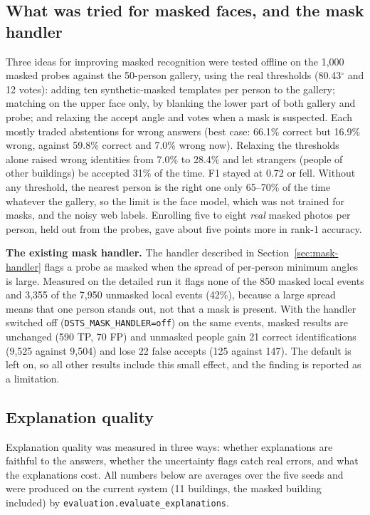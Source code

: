 \documentclass[12pt,a4paper,oneside]{report}
\begin{document}
\subsection{What was tried for masked faces, and the mask handler}\label{sec:res-mask}
Three ideas for improving masked recognition were tested offline on the 1,000 masked probes against the 50-person gallery, using the real thresholds (80.43$^{\circ}$ and 12 votes): adding ten synthetic-masked templates per person to the gallery; matching on the upper face only, by blanking the lower part of both gallery and probe; and relaxing the accept angle and votes when a mask is suspected. Each mostly traded abstentions for wrong answers (best case: 66.1\% correct but 16.9\% wrong, against 59.8\% correct and 7.0\% wrong now). Relaxing the thresholds alone raised wrong identities from 7.0\% to 28.4\% and let strangers (people of other buildings) be accepted 31\% of the time. F1 stayed at 0.72 or fell. Without any threshold, the nearest person is the right one only 65--70\% of the time whatever the gallery, so the limit is the face model, which was not trained for masks, and the noisy web labels. Enrolling five to eight \emph{real} masked photos per person, held out from the probes, gave about five points more in rank-1 accuracy.







\textbf{The existing mask handler.} The handler described in Section~\ref{sec:mask-handler} flags a probe as masked when the spread of per-person minimum angles is large. Measured on the detailed run it flags none of the 850 masked local events and 3,355 of the 7,950 unmasked local events (42\%), because a large spread means that one person stands out, not that a mask is present. With the handler switched off (\texttt{DSTS\_\allowbreak MASK\_\allowbreak HANDLER=off}) on the same events, masked results are unchanged (590 TP, 70 FP) and unmasked people gain 21 correct identifications (9,525 against 9,504) and lose 22 false accepts (125 against 147). The default is left on, so all other results include this small effect, and the finding is reported as a limitation.

\subsection{Explanation quality}\label{sec:res-expl}
Explanation quality was measured in three ways: whether explanations are faithful to the answers, whether the uncertainty flags catch real errors, and what the explanations cost. All numbers below are averages over the five seeds and were produced on the current system (11 buildings, the masked building included) by \texttt{evaluation.evaluate\_\allowbreak explanations}.
\end{document}
